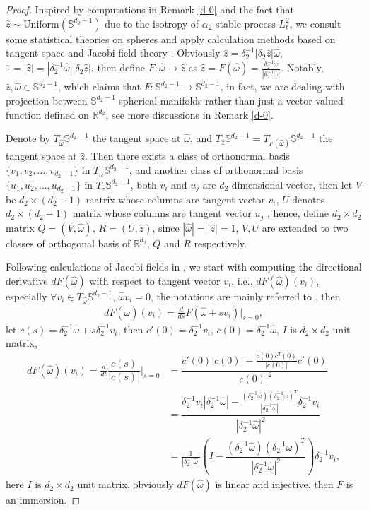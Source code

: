 \documentclass[11pt,reqno]{amsart}
\numberwithin{equation}{section}
\newcommand{\s}{\mathbb{S}}
\newcommand{\al}{\alpha}
\newcommand{\om}{\omega}
\newcommand{\de}{\delta}
\newcommand{\mb}{\mathbb}
\begin{document}
\begin{proof}
Inspired by computations in Remark \ref{d-0} and the fact that $\hat{z}\sim  \text{Uniform} (\s^{d_2-1})$ due to the isotropy of $\al_{2}$-stable process $L_t^2$, we consult some statistical theories on spheres \cite{YC,FKN,KP,CGS} and apply calculation methods based on tangent space and Jacobi field theory \cite{YC,JJ}.
Obviously $\hat{z}=\de_2^{-1}|\de_{2}\hat{z}|\hat{\om}$, $1=|\hat{z}|=|\de_2^{-1}\hat{\om}||\de_{2}\hat{z}|$, then define $F:\hat{\om}\rightarrow \hat{z}$ as $\hat{z}=F(\hat{\om})=\frac{\de^{-1}_2 \hat{\om}}{|\de^{-1}_2 \hat{\om}|}$. Notably, $\hat{z},  \hat{\om}\in\s^{d_2-1}$,  which claims that  %
$F:\s^{d_2-1}\rightarrow\s^{d_2-1}$,  in fact, we are dealing with projection between $\s^{d_2-1}$ spherical manifolds rather than just a vector-valued function defined on $\mb{R}^{d_2}$, see more discussions in Remark \ref{d-0}.

Denote by $T_{\hat{\om}}\s^{d_2-1}$ the tangent space at $\hat{\om}$, and $T_{\hat{z}}\s^{d_2-1}=T_{F(\hat{\om})}\s^{d_2-1}$ the tangent space at $\hat{z}$. Then there exists a class of orthonormal basis $\{v_{1},v_{2},\dots,v_{d_2-1}\}$ in $T_{\hat{\om}}\s^{d_2-1}$, and another class of orthonormal basis
$\{u_{1},u_{2},\dots,u_{d_2-1}\}$ in $T_{\hat{z}}\s^{d_2-1}$, both $v_i$ and $u_j$ are $d_2$-dimensional vector, then let $V$ be $d_2\times (d_2-1)$ matrix whose columns are tangent vector $v_i$, $U$ denotes $d_2\times (d_2-1)$ matrix whose columns are tangent vector $u_j$ \cite[6, Section 1.2]{JJ}, hence, define $d_2\times d_2$ matrix $Q=(V,\hat{\om})$, $R=(U,\hat{z})$, since $|\hat{\om}|=|\hat{z}|=1$, $V,U$ are extended to two classes of orthogonal basis of $\mb{R}^{d_2}$, $Q$ and $R$ respectively.

Following calculations of Jacobi fields in \cite[Section 5.2]{JJ}, we start with computing the directional derivative $dF(\hat{\om})$ with respect to tangent vector $v_i$, i.e., $dF(\hat{\om})(v_i)$, 
especially $\forall v_i\in T_{\hat{\om}}\s^{d_2-1}$, $\hat{\om} v_i=0$, the notations are mainly referred to \cite[7, Section 1.2]{JJ},  then
\begin{align*}
	dF(\hat{\om})(v_i)=\frac{d}{ds}F(\hat{\om}+sv_i)\Big|_{s=0},
\end{align*}
 let $c(s)=\de^{-1}_2\hat{\om}+s\de^{-1}_2v_i$, then $c'(0)=\de^{-1}_2v_i$, $c(0)=\de^{-1}_2\hat{\om}$, $I$ is $d_2\times d_2$ unit matrix, 
\begin{align*}
	dF(\hat{\om})(v_i)=\frac{d}{dt}\dfrac{c(s)}{|c(s)|}\Big|_{s=0}&=\dfrac{c'(0)|c(0)|-\frac{c(0)c^T(0)}{|c(0)|}c'(0)}{|c(0)|^{2}}\\
	&=\dfrac{\de^{-1}_2v_i|\de^{-1}_2\hat{\om}|-\frac{(\de^{-1}_2\hat{\om})(\de^{-1}_2\hat{\om})^T}{|\de^{-1}_2\hat{\om}|}\de^{-1}_2v_i}{|\de^{-1}_2\hat{\om}|^{2}}\\
	&=\frac{1}{|\de^{-1}_2\hat{\om}|}\left(I-\dfrac{(\de^{-1}_2\hat{\om})(\de^{-1}_2\hat{\om})^T}{|\de^{-1}_2\hat{\om}|^{2}} \right)\de^{-1}_2v_i,
\end{align*}
here $I$ is $d_2\times d_2$ unit matrix,  obviously $dF({\hat{\om}})$ is linear and injective, then $F$ is an immersion.


\end{proof}
\end{document}
